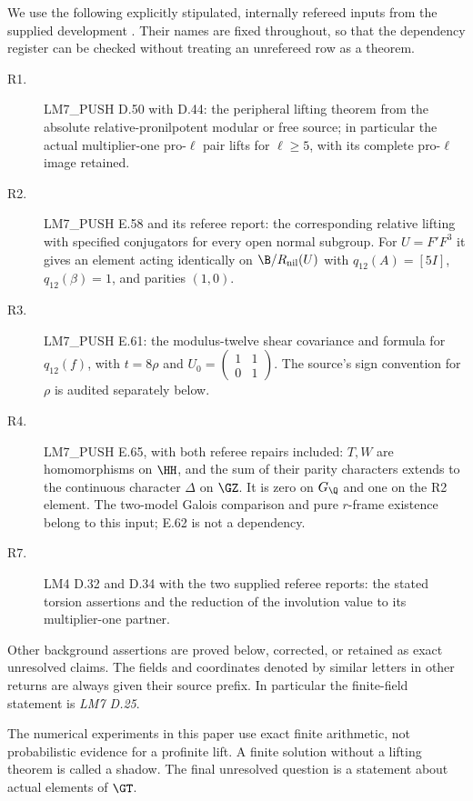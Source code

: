 We use the following explicitly stipulated, internally refereed
inputs from the supplied development \citep{SuppliedReferees2026}.
Their names are fixed throughout, so that the dependency register
can be checked without treating an unrefereed row as a theorem.
\begin{description}
\item[R1.] LM7\_PUSH D.50 with D.44: the peripheral lifting theorem
from the absolute relative-pronilpotent modular or free source;
in particular the actual multiplier-one pro-$\ell$ pair lifts
for $\ell\ge5$, with its complete pro-$\ell$ image retained.
\item[R2.] LM7\_PUSH E.58 and its referee report: the corresponding
relative lifting with specified conjugators for every open normal
subgroup. For $U=F'F^3$ it gives an element acting identically on
$\B/R_{\rm nil}(U)$ with $q_{12}(A)=[5I]$,
$q_{12}(\beta)=1$, and parities $(1,0)$.
\item[R3.] LM7\_PUSH E.61: the modulus-twelve shear covariance and
formula for $q_{12}(f)$, with $t=8\rho$ and
$U_0=\left(\begin{smallmatrix}1&1\\0&1\end{smallmatrix}\right)$.
The source's sign convention for $\rho$ is audited separately below.
\item[R4.] LM7\_PUSH E.65, with both referee repairs included:
$T,W$ are homomorphisms on $\HH$, and the sum of their parity
characters extends to the continuous character $\Delta$ on $\GZ$.
It is zero on $G_{\Q}$ and one on the R2 element. The two-model
Galois comparison and pure $r$-frame existence belong to this input;
E.62 is not a dependency.
\item[R7.] LM4 D.32 and D.34 with the two supplied referee reports:
the stated torsion assertions and the reduction of the involution
value to its multiplier-one partner.
\end{description}
Other background assertions are proved below, corrected, or retained
as exact unresolved claims. The fields and coordinates denoted by
similar letters in other returns are always given their source prefix.
In particular the finite-field statement is \emph{LM7 D.25}.

The numerical experiments in this paper use exact finite arithmetic,
not probabilistic evidence for a profinite lift. A finite solution
without a lifting theorem is called a shadow. The final unresolved
question is a statement about actual elements of $\GT$.

